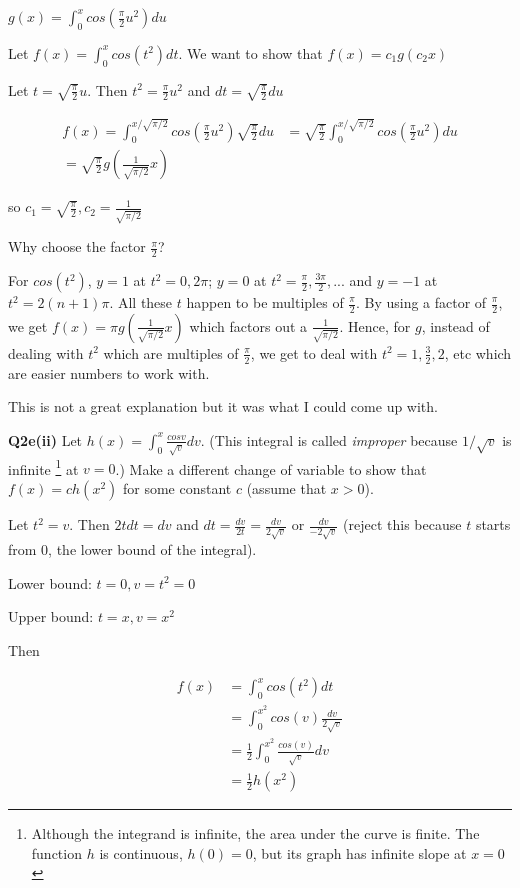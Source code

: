 \documentclass[9pt]{article}
\begin{document}
$g(x) = \int_{0}^{x} cos(\frac{\pi}{2}u^2) du$

Let $f(x) = \int_0^{x} cos(t^2) dt$. We want to show that $f(x) = c_1g(c_2x)$

Let $t = \sqrt{\frac{\pi}{2}} u$. Then $t^2 = \frac{\pi}{2}u^2$ and $dt = \sqrt{\frac{\pi}{2}} du$

\begin{align*}
  f(x) = \int_0^{x / \sqrt{\pi/2}} cos(\frac{\pi}{2}u^2) \sqrt{\frac{\pi}{2}} du &= \sqrt{\frac{\pi}{2}} \int_0^{x / \sqrt{\pi / 2}} cos(\frac{\pi}{2} u^2) du \\
  = \sqrt{\frac{\pi}{2}} g(\frac{1}{\sqrt{\pi / 2}} x)
\end{align*}

so $c_1 = \sqrt{\frac{\pi}{2}}, c_2 = \frac{1}{\sqrt{\pi / 2}}$

Why choose the factor $\frac{\pi}{2}$?

For $cos(t^2)$, $y = 1$ at $t^2 = 0, 2\pi$; $y = 0$ at $t^2 = \frac{\pi}{2}, \frac{3\pi}{2}, ...$ and $y = -1$ at $t^2 = 2(n+1)\pi$. All these $t$ happen to be multiples of $\frac{\pi}{2}$. By using a factor of $\frac{\pi}{2}$, we get $f(x) = \pi g(\frac{1}{\sqrt{\pi / 2}} x)$ which factors out a $\frac{1}{\sqrt{\pi / 2}}$. Hence, for $g$, instead of dealing with $t^2$ which are multiples of $\frac{\pi}{2}$, we get to deal with $t^2 = 1, \frac{3}{2}, 2$, etc which are easier numbers to work with.

This is not a great explanation but it was what I could come up with.


\begin{tcolorbox}
  \textbf{Q2e(ii)} Let $h(x) = \int_0^x \frac{cos v}{\sqrt{v}} dv$. (This integral is called \emph{improper} because $1 / \sqrt{v}$ is infinite \footnote{Although the integrand is infinite, the area under the curve is finite. The function $h$ is continuous, $h(0) = 0$, but its graph has infinite slope at $x = 0$} at $v = 0$.) Make a different change of variable to show that $f(x) = ch(x^2)$ for some constant $c$ (assume that $x > 0$).
\end{tcolorbox}

Let $t^2 = v$. Then $2t dt = dv$ and $dt = \frac{dv}{2t} = \frac{dv}{2\sqrt{v}}$ or $\frac{dv}{-2\sqrt{v}}$ (reject this because $t$ starts from 0, the lower bound of the integral).

Lower bound: $t = 0, v = t^2 = 0$

Upper bound: $t = x, v = x^2$

Then

\begin{align*}
  f(x) &= \int_0^x cos(t^2) dt \\
  &= \int_0^{x^2} cos(v) \frac{dv}{2\sqrt{v}} \\
  &= \frac{1}{2} \int_0^{x^2} \frac{cos(v)}{\sqrt{v}} dv \\
  &= \frac{1}{2} h(x^2)
\end{align*}
\end{document}
